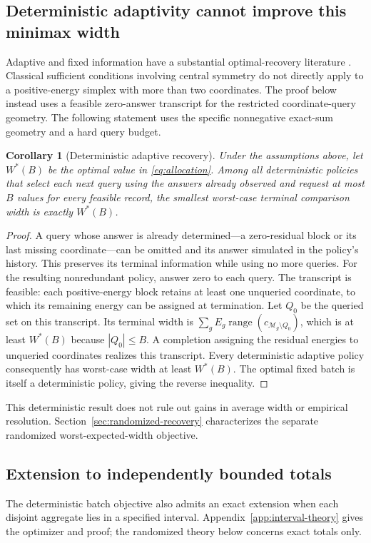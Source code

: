 \documentclass[12pt]{article}
\newtheorem{corollary}{Corollary}
\newcommand{\M}{\mathcal{M}}
\begin{document}
\subsection{Deterministic adaptivity cannot improve this minimax width}
Adaptive and fixed information have a substantial optimal-recovery
literature \cite{osipenko}. Classical sufficient conditions involving
central symmetry do not directly apply to a positive-energy simplex with
more than two coordinates. The proof below instead uses a feasible
zero-answer transcript for the restricted coordinate-query geometry.
The following statement uses the specific
nonnegative exact-sum geometry and a hard query budget.
\begin{corollary}[Deterministic adaptive recovery]
Under the assumptions above, let $W^*(B)$ be the optimal value in
\eqref{eq:allocation}. Among all deterministic policies that select each
next query using the answers already observed and request at most $B$
values for every feasible record, the smallest worst-case terminal
comparison width is exactly $W^*(B)$.
\end{corollary}
\begin{proof}
A query whose answer is already determined---a zero-residual block or its
last missing coordinate---can be omitted and its answer simulated in the
policy's history. This preserves its terminal information while using no
more queries. For the resulting nonredundant policy, answer zero to each
query. The transcript is feasible: each positive-energy block retains at
least one unqueried coordinate, to which its remaining energy can be
assigned at termination. Let $Q_0$ be the queried set on this transcript.
Its terminal width is $\sum_g E_g\operatorname{range}(c_{\M_g\setminus Q_0})$,
which is at least $W^*(B)$ because $|Q_0|\leq B$. A completion assigning
the residual energies to unqueried coordinates realizes this transcript.
Every deterministic adaptive policy consequently has worst-case width
at least $W^*(B)$. The optimal fixed batch is itself a deterministic policy,
giving the reverse inequality.
\end{proof}
This deterministic result does not rule out gains in average width or
empirical resolution. Section~\ref{sec:randomized-recovery} characterizes
the separate randomized worst-expected-width objective.


\subsection{Extension to independently bounded totals}
The deterministic batch objective also admits an exact extension when each
disjoint aggregate lies in a specified interval. Appendix~\ref{app:interval-theory}
gives the optimizer and proof; the randomized theory below concerns exact
totals only.
\end{document}
